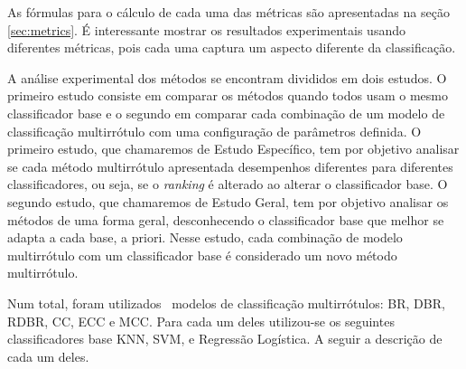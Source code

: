 As fórmulas para o cálculo de cada uma das métricas são apresentadas na seção \ref{sec:metrics}.
É interessante mostrar os resultados experimentais usando diferentes métricas, pois cada uma captura
um aspecto diferente da classificação. 

A análise experimental dos métodos se encontram divididos em dois estudos. O primeiro estudo consiste em
comparar os métodos quando todos usam o mesmo classificador base e o segundo em comparar cada combinação de um
modelo de classificação multirrótulo com uma configuração de parâmetros definida. 
O primeiro estudo, que chamaremos de Estudo Específico, tem por objetivo analisar se cada método multirrótulo apresentada desempenhos diferentes para
diferentes classificadores, ou seja, se o \textit{ranking} é alterado ao alterar o classificador base.
O segundo estudo, que chamaremos de Estudo Geral,
tem por objetivo analisar os métodos de uma forma geral,
desconhecendo o classificador base que melhor se adapta a cada base, a priori.
Nesse estudo, cada combinação de modelo multirrótulo com um classificador base é considerado
um novo método multirrótulo.

Num total, foram utilizados \Nml~modelos de classificação multirrótulos: BR, DBR, RDBR, CC, ECC e MCC.
Para cada um deles utilizou-se os seguintes classificadores base KNN, SVM, \jqo e Regressão Logística.
A seguir a descrição de cada um deles.

